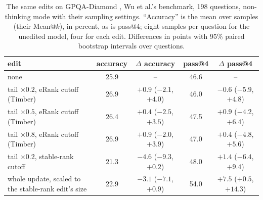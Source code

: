 \begin{table}[t]
\caption{The same edits on GPQA-Diamond \citep{rein2024gpqa}, Wu et al.'s
benchmark, 198 questions, non-thinking mode with their sampling settings.
``Accuracy'' is the mean over samples (their Mean@$k$), in percent, as is
pass@4; eight samples per
question for the unedited model, four for each edit. Differences in points
with 95\% paired bootstrap intervals over questions.}
\label{tab:gpqa}
\begin{center}
\small
\setlength{\tabcolsep}{4pt}
\begin{tabular}{lcccc}
\toprule
edit & accuracy & $\Delta$ accuracy & pass@4 & $\Delta$ pass@4 \\
\midrule
none                                      & 25.9 & --                       & 46.6 & -- \\
tail $\times 0.2$, eRank cutoff (Timber)  & 26.9 & $+0.9$ ($-2.1$, $+4.0$)  & 46.0 & $-0.6$ ($-5.9$, $+4.8$) \\
tail $\times 0.5$, eRank cutoff (Timber)  & 26.4 & $+0.4$ ($-2.5$, $+3.5$)  & 47.5 & $+0.9$ ($-4.2$, $+6.4$) \\
tail $\times 0.8$, eRank cutoff (Timber)  & 26.9 & $+0.9$ ($-2.0$, $+3.9$)  & 47.0 & $+0.4$ ($-4.8$, $+5.6$) \\
tail $\times 0.2$, stable-rank cutoff     & 21.3 & $-4.6$ ($-9.3$, $+0.2$)  & 48.0 & $+1.4$ ($-6.4$, $+9.4$) \\
whole update, scaled to the stable-rank edit's size & 22.9 & $-3.1$ ($-7.1$, $+0.9$)  & 54.0 & $+7.5$ ($+0.5$, $+14.3$) \\
\bottomrule
\end{tabular}
\end{center}
\end{table}

